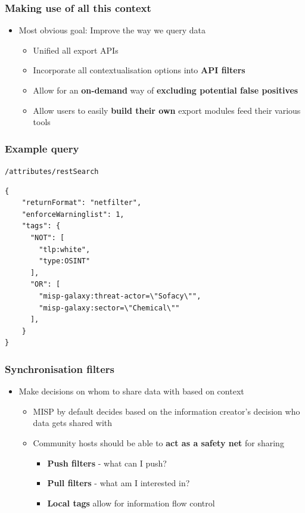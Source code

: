 \begin{frame}
  \frametitle{Making use of all this context}
  \begin{itemize}
    \item Most obvious goal: Improve the way we query data
    \begin{itemize}
      \item Unified all export APIs
      \item Incorporate all contextualisation options into {\bf API filters}
      \item Allow for an {\bf on-demand} way of {\bf excluding potential false positives}
      \item Allow users to easily {\bf build their own} export modules feed their various tools
    \end{itemize}
  \end{itemize}
\end{frame}

\begin{frame}[fragile]
    \frametitle{Example query}
    \texttt{/attributes/restSearch}
    \begin{lstlisting}
{
    "returnFormat": "netfilter",
    "enforceWarninglist": 1,
    "tags": {
      "NOT": [
        "tlp:white",
        "type:OSINT"
      ],
      "OR": [
        "misp-galaxy:threat-actor=\"Sofacy\"",
        "misp-galaxy:sector=\"Chemical\""
      ],
    }
}
    \end{lstlisting}
\end{frame}

\begin{frame}
  \frametitle{Synchronisation filters}
  \begin{itemize}
    \item Make decisions on whom to share data with based on context
    \begin{itemize}
      \item MISP by default decides based on the information creator's decision who data gets shared with
      \item Community hosts should be able to {\bf act as a safety net} for sharing
      \begin{itemize}
        \item {\bf Push filters} - what can I push?
        \item {\bf Pull filters} - what am I interested in?
        \item {\bf Local tags} allow for information flow control
      \end{itemize}
    \end{itemize}
  \end{itemize}
\end{frame}

